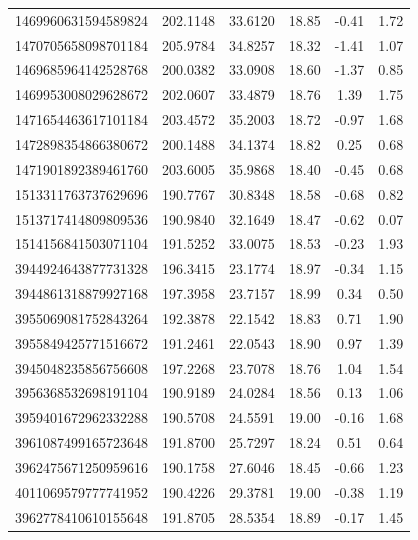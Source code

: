 \begin{longtable}{c c c c c c}
1469960631594589824 & 202.1148 & 33.6120 & 18.85 & -0.41 & 1.72 \\
1470705658098701184 & 205.9784 & 34.8257 & 18.32 & -1.41 & 1.07 \\
1469685964142528768 & 200.0382 & 33.0908 & 18.60 & -1.37 & 0.85 \\
1469953008029628672 & 202.0607 & 33.4879 & 18.76 & 1.39 & 1.75 \\
1471654463617101184 & 203.4572 & 35.2003 & 18.72 & -0.97 & 1.68 \\
1472898354866380672 & 200.1488 & 34.1374 & 18.82 & 0.25 & 0.68 \\
1471901892389461760 & 203.6005 & 35.9868 & 18.40 & -0.45 & 0.68 \\
1513311763737629696 & 190.7767 & 30.8348 & 18.58 & -0.68 & 0.82 \\
1513717414809809536 & 190.9840 & 32.1649 & 18.47 & -0.62 & 0.07 \\
1514156841503071104 & 191.5252 & 33.0075 & 18.53 & -0.23 & 1.93 \\
3944924643877731328 & 196.3415 & 23.1774 & 18.97 & -0.34 & 1.15 \\
3944861318879927168 & 197.3958 & 23.7157 & 18.99 & 0.34 & 0.50 \\
3955069081752843264 & 192.3878 & 22.1542 & 18.83 & 0.71 & 1.90 \\
3955849425771516672 & 191.2461 & 22.0543 & 18.90 & 0.97 & 1.39 \\
3945048235856756608 & 197.2268 & 23.7078 & 18.76 & 1.04 & 1.54 \\
3956368532698191104 & 190.9189 & 24.0284 & 18.56 & 0.13 & 1.06 \\
3959401672962332288 & 190.5708 & 24.5591 & 19.00 & -0.16 & 1.68 \\
3961087499165723648 & 191.8700 & 25.7297 & 18.24 & 0.51 & 0.64 \\
3962475671250959616 & 190.1758 & 27.6046 & 18.45 & -0.66 & 1.23 \\
4011069579777741952 & 190.4226 & 29.3781 & 19.00 & -0.38 & 1.19 \\
3962778410610155648 & 191.8705 & 28.5354 & 18.89 & -0.17 & 1.45 \\

\end{longtable}
